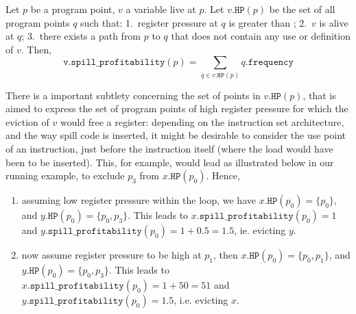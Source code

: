{\begin{definition}
  Let $p$ be a program point, $v$ a variable live at $p$.
  Let $v.\texttt{HP}(p)$ be the set of all program points $q$ such that:
  1.~register pressure at $q$ is greater than \regs;
  2.~$v$ is alive at $q$;
  3.~there exists a path from $p$ to $q$ that does not contain any use or definition of $v$.
  Then,
  $$\texttt{v.spill\_profitability}(p) = \sum_{q\in v.\texttt{HP}(p)} q.\texttt{frequency}$$
\end{definition}

There is a important subtlety concerning the set of points in $v.\texttt{HP}(p)$, that is aimed to express the set of program points of high register pressure for which the eviction of $v$ would free a register:
depending on the instruction set architecture, and the way spill code is inserted, it might be desirable to consider the use point of an instruction, just before the instruction itself (where the load would have been to be inserted).
This, for example, would lead as illustrated below in our running example, to exclude $p_3$ from $x.\texttt{HP}(p_0)$.
Hence,
\begin{enumerate}
\item assuming low register pressure within the loop, we have $x.\texttt{HP}(p_0)=\{p_0\}$, and $y.\texttt{HP}(p_0)=\{p_0,p_3\}$. 
  This leads to $x.\texttt{spill\_profitability}(p_0)=1$ and $y.\texttt{spill\_profitability}(p_0)=1+0.5=1.5$, ie. evicting $y$.
\item now assume register pressure to be high at $p_1$, then $x.\texttt{HP}(p_0)=\{p_0,p_1\}$, and $y.\texttt{HP}(p_0)=\{p_0,p_3\}$. This leads to $x.\texttt{spill\_profitability}(p_0)=1+50=51$ and $y.\texttt{spill\_profitability}(p_0)=1.5$, i.e. evicting $x$.
\end{enumerate}

}
